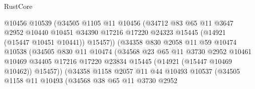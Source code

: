 \begin{lexlean}{RustCore}
\begin{coremodule}
                              @10456
                              @10539
                              (@34505
                                @1105
                                @11
                                @10456
                                (@34712
                                  @83
                                  @65
                                  @11
                                  @3647
                                  @2952
                                  @10440
                                  @10451
                                  @34390
                                  @17216
                                  @17220
                                  @24323
                                  @15445
                                  (@14921 (@15447 @10451 @10441))
                                  @15457))
                              (@34358
                                @830
                                @2058
                                @11
                                @59
                                @10474
                                @10538
                                (@34505
                                  @830
                                  @11
                                  @10474
                                  (@34568
                                    @23
                                    @65
                                    @11
                                    @3730
                                    @2952
                                    @10461
                                    @10469
                                    @34405
                                    @17216
                                    @17220
                                    @23834
                                    @15445
                                    (@14921 (@15447 @10469 @10462))
                                    @15457))
                                (@34358
                                  @1158
                                  @2057
                                  @11
                                  @44
                                  @10493
                                  @10537
                                  (@34505
                                    @1158
                                    @11
                                    @10493
                                    (@34568
                                      @38
                                      @65
                                      @11
                                      @3730
                                      @2952

\end{coremodule}
\end{lexlean}
